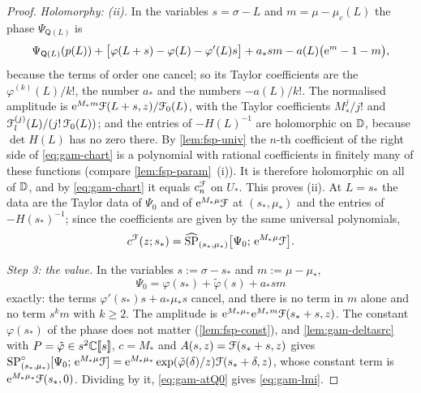 \begin{proof}
\emph{Holomorphy: (ii).} In the variables $s=\sigma-L$ and $m=\mu-\mu_c(L)$ the phase $\Psi_{\mathsf Q(L)}$ is
\[
\Psi_{\mathsf Q(L)}(p(L))+\bigl[\varphi(L+s)-\varphi(L)-\varphi'(L)s\bigr]+a_*sm-a(L)\bigl(\mathrm{e}^{m}-1-m\bigr),
\]
because the terms of order one cancel; so its Taylor coefficients are the $\varphi^{(k)}(L)/k!$, the number $a_*$ and the numbers $-a(L)/k!$. The normalised amplitude is $\mathrm{e}^{M_*m}\mathcal{F}(L+s,z)/\mathcal{F}_0(L)$, with the Taylor coefficients $M_*^j/j!$ and $\mathcal{F}_l^{(j)}(L)/(j!\,\mathcal{F}_0(L))$; and the entries of $-H(L)^{-1}$ are holomorphic on $\mathbb{D}$, because $\det H(L)$ has no zero there. By \cref{lem:fsp-univ} the $n$-th coefficient of the right side of \eqref{eq:gam-chart} is a polynomial with rational coefficients in finitely many of these functions (compare \cref{lem:fsp-param}~(i)). It is therefore holomorphic on all of $\mathbb{D}$, and by \eqref{eq:gam-chart} it equals $c^{\mathcal{F}}_n$ on $U_*$. This proves (ii). At $L=s_*$ the data are the Taylor data of $\Psi_0$ and of $\mathrm{e}^{M_*\mu}\mathcal{F}$ at $(s_*,\mu_*)$ and the entries of $-H(s_*)^{-1}$; since the coefficients are given by the same universal polynomials,
\begin{equation}
\label{eq:gam-atQ0}
c^{\mathcal{F}}(z;s_*)=\widehat{\mathrm{SP}}_{(s_*,\mu_*)}\bigl[\Psi_0;\,\mathrm{e}^{M_*\mu}\mathcal{F}\bigr].
\end{equation}

\emph{Step 3: the value.} In the variables $s:=\sigma-s_*$ and $m:=\mu-\mu_*$,
\[
\Psi_0=\varphi(s_*)+\tilde\varphi(s)+a_*sm
\]
exactly: the terms $\varphi'(s_*)s+a_*\mu_*s$ cancel, and there is no term in $m$ alone and no term $s^km$ with $k\geq 2$. The amplitude is $\mathrm{e}^{M_*\mu_*}\mathrm{e}^{M_*m}\mathcal{F}(s_*+s,z)$. The constant $\varphi(s_*)$ of the phase does not matter (\cref{lem:fsp-const}), and \cref{lem:gam-deltasrc} with $P=\tilde\varphi\in s^2\mathbb{C}[\![ s ]\!]$, $c=M_*$ and $A(s,z)=\mathcal{F}(s_*+s,z)$ gives $\mathrm{SP}^{\circ}_{(s_*,\mu_*)}[\Psi_0;\,\mathrm{e}^{M_*\mu}\mathcal{F}]=\mathrm{e}^{M_*\mu_*}\exp(\tilde\varphi(\delta)/z)\mathcal{F}(s_*+\delta,z)$, whose constant term is $\mathrm{e}^{M_*\mu_*}\mathcal{F}(s_*,0)$. Dividing by it, \eqref{eq:gam-atQ0} gives \eqref{eq:gam-lmi}.
\end{proof}


